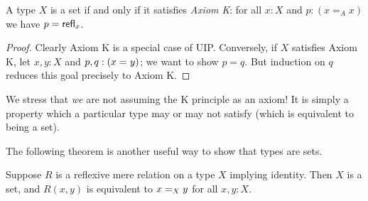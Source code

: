 \begin{thm}\label{thm:h-set-uip-K}
 A type $X$ is a set if and only if it satisfies \emph{Axiom K}: for all $x : X$ and $p : (x =_A x)$ we have $p = \refl{x}$.
\end{thm}

\begin{proof}
  Clearly Axiom K is a special case of UIP.
  Conversely, if $X$ satisfies Axiom K, let $x, y : X$ and $p, q : (\id{x}{y})$; we want to show $p=q$.
  But induction on $q$ reduces this goal precisely to Axiom K.
\end{proof}

We stress that \emph{we} are not assuming the K principle as an axiom!
It is simply a property which a particular type may or may not satisfy (which is equivalent to being a set).

The following theorem is another useful way to show that types are sets.

\begin{thm}\label{thm:h-set-refrel-in-paths-sets}
  Suppose $R$ is a reflexive mere relation on a type $X$ implying identity.
  Then $X$ is a set, and $R(x,y)$ is equivalent to $\id[X]{x}{y}$ for all $x,y:X$.
\end{thm}

